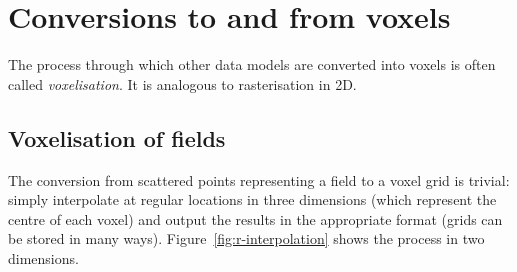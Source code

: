 \section{Conversions to and from voxels}

The process through which other data models are converted into voxels is often called \emph{voxelisation}.
It is analogous to rasterisation in 2D.

\subsection{Voxelisation of fields}
 
The conversion from scattered points representing a field to a voxel grid is trivial: simply interpolate at regular locations in three dimensions%
(which represent the centre of each voxel) and output the results in the appropriate format (grids can be stored in many ways). 
Figure~\ref{fig:r-interpolation} shows the process in two dimensions.
